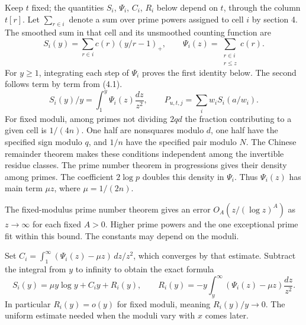 \documentclass[11pt,letterpaper]{article}
\begin{document}
{Keep $t$ fixed; the quantities $S_i$, $\Psi_i$, $C_i$, $R_i$ below depend on $t$, through the column $t[r]$. Let $\sum_{r\in i}$ denote a sum over prime powers assigned to cell $i$ by section 4. The smoothed sum in that cell and its unsmoothed counting function are
\begin{equation}\label{D:59}
 S_i(y)=\sum_{r\in i}c(r)(y/r-1)_+,\qquad
 \Psi_i(z)=\sum_{\substack{r\in i\\r\le z}}c(r).
\end{equation}
For $y\ge1$, integrating each step of $\Psi_i$ proves the first identity below. The second follows term by term from (4.1).
\begin{equation}\label{D:60}
 S_i(y)/y=\int_1^y\Psi_i(z)\frac{dz}{z^2},\qquad
 P_{u,t,j}=\sum_i w_iS_i(a/w_i).                              \tag{5.1}
\end{equation}
For fixed moduli, among primes not dividing $2qd$ the fraction contributing to a given cell is $1/(4n)$. One half are nonsquares modulo $d$, one half have the specified sign modulo $q$, and $1/n$ have the specified pair modulo $N$. The Chinese remainder theorem makes these conditions independent among the invertible residue classes. The prime number theorem in progressions gives their density among primes. The coefficient $2\log p$ doubles this density in $\Psi_i$. Thus $\Psi_i(z)$ has main term $\mu z$, where $\mu=1/(2n)$.

The fixed-modulus prime number theorem gives an error $O_A(z/(\log z)^A)$ as $z\to\infty$ for each fixed $A>0$. Higher prime powers and the one exceptional prime fit within this bound. The constants may depend on the moduli.

Set $C_i=\int_1^\infty(\Psi_i(z)-\mu z)\,dz/z^2$, which converges by that estimate. Subtract the integral from $y$ to infinity to obtain the exact formula
\begin{equation}\label{D:61}
 S_i(y)=\mu y\log y+C_i y+R_i(y),\qquad
 R_i(y)=-y\int_y^\infty(\Psi_i(z)-\mu z)\frac{dz}{z^2}.        \tag{5.2}
\end{equation}
In particular $R_i(y)=o(y)$ for fixed moduli, meaning $R_i(y)/y\to0$. The uniform estimate needed when the moduli vary with $x$ comes later.

}
\end{document}
